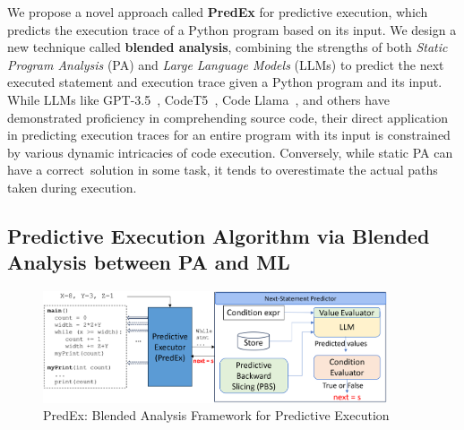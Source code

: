 
We propose a novel approach called {\bf PredEx} for predictive execution, which predicts the execution trace of a Python program based on its input. We design a new technique called {\bf blended analysis}, combining the strengths of both {\em Static Program Analysis} (PA) and {\em Large Language Models} (LLMs) to predict the next executed statement and execution trace given a Python program and its input. While LLMs like GPT-3.5~\cite{GPT3.5}, CodeT5~\cite{wang2023codet5}, Code Llama~\cite{code_llama}, 
and others have demonstrated proficiency in comprehending source code,
their direct application in predicting execution traces for an entire
program with its input is constrained by various dynamic intricacies
of code execution. Conversely, while static PA can have a
correct~solution in some task, it tends to overestimate the actual
paths taken during execution.

\subsection{Predictive Execution Algorithm via Blended Analysis between PA and ML}

\begin{figure}
\begin{center}
\includegraphics[width=4in]{overview-4.png}
\vspace{-22pt}
\caption{PredEx: Blended Analysis Framework for Predictive Execution}
\label{fig:overview}
\end{center}
\end{figure}

